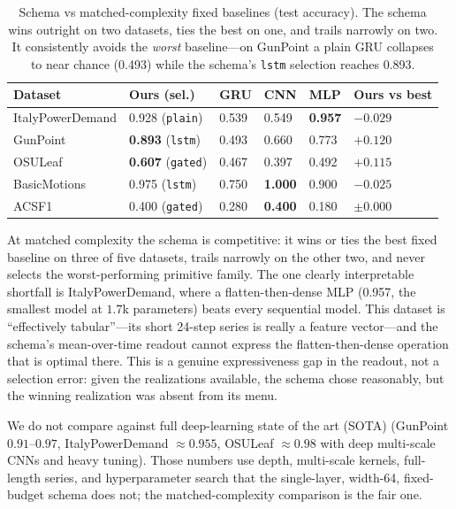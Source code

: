 \documentclass[11pt]{article}
\newcommand{\allowbreakhere}{\discretionary{}{}{}}
\newcommand{\code}[1]{\texttt{\def\_{\char`_\allowbreakhere}#1}}
\begin{document}
\begin{table}[h]
\centering
\small
\renewcommand{\arraystretch}{1.2}
\begin{tabular}{p{3.4cm} p{2.0cm} p{1.2cm} p{1.2cm} p{1.2cm} p{2.3cm}}
\toprule
\textbf{Dataset} & \textbf{Ours (sel.)} & \textbf{GRU} & \textbf{CNN} & \textbf{MLP} & \textbf{Ours vs best}\\
\midrule
ItalyPowerDemand & 0.928 (\code{plain}) & 0.539 & 0.549 & \textbf{0.957} & $-0.029$\\
GunPoint         & \textbf{0.893} (\code{lstm}) & 0.493 & 0.660 & 0.773 & $+0.120$\\
OSULeaf          & \textbf{0.607} (\code{gated}) & 0.467 & 0.397 & 0.492 & $+0.115$\\
BasicMotions     & 0.975 (\code{lstm}) & 0.750 & \textbf{1.000} & 0.900 & $-0.025$\\
ACSF1            & 0.400 (\code{gated}) & 0.280 & \textbf{0.400} & 0.180 & $\pm0.000$\\
\bottomrule
\end{tabular}
\caption{Schema vs matched-complexity fixed baselines (test accuracy). The
schema wins outright on two datasets, ties the best on one, and trails narrowly on two. It
consistently avoids the \emph{worst} baseline---on GunPoint a plain GRU collapses to near
chance (0.493) while the schema's \code{lstm} selection reaches 0.893.}
\label{tab:baselines}
\end{table}

At matched complexity the schema is competitive: it wins or ties the best fixed
baseline on three of five datasets, trails narrowly on the other two, and never selects the
worst-performing primitive family. The one clearly interpretable shortfall is
ItalyPowerDemand, where a flatten-then-dense MLP (0.957, the smallest model at $1.7$k
parameters) beats every sequential model. This dataset is ``effectively tabular''---its short
24-step series is really a feature vector---and the schema's mean-over-time readout cannot
express the flatten-then-dense operation that is optimal there. This is a genuine
expressiveness gap in the readout, not a selection error: given the realizations available, the
schema chose reasonably, but the winning realization was absent from its menu.

We do not compare against full deep-learning state of the art (SOTA) (GunPoint $0.91$--$0.97$,
ItalyPowerDemand $\approx0.955$, OSULeaf $\approx0.98$ with deep multi-scale CNNs and heavy
tuning). Those numbers use depth, multi-scale kernels, full-length series, and hyperparameter
search that the single-layer, width-64, fixed-budget schema does not; the matched-complexity
comparison is the fair one.
\end{document}
